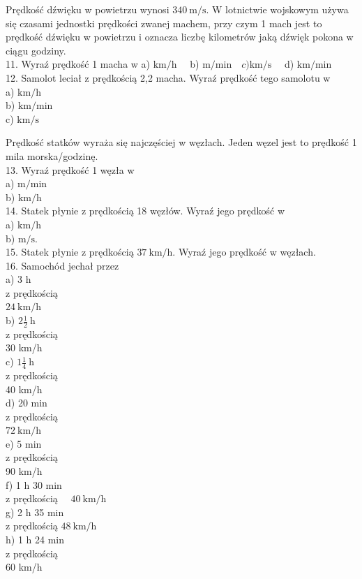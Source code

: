 \documentclass[10pt]{article}
\begin{document}
Prędkość dźwięku w powietrzu wynosi \(340 \mathrm{~m} / \mathrm{s}\). W lotnictwie wojskowym używa się czasami jednostki prędkości zwanej machem, przy czym 1 mach jest to prędkość dźwięku w powietrzu i oznacza liczbę kilometrów jaką dźwięk pokona w ciągu godziny.\\
11. Wyraź prędkość 1 macha w a) \(\mathrm{km} / \mathrm{h} \quad\) b) \(\mathrm{m} / \mathrm{min} \quad c) \mathrm{km} / \mathrm{s} \quad\) d) \(\mathrm{km} / \mathrm{min}\)\\
12. Samolot leciał z prędkością 2,2 macha. Wyraź prędkość tego samolotu w\\
a) \(\mathrm{km} / \mathrm{h}\)\\
b) \(\mathrm{km} / \mathrm{min}\)\\
c) \(\mathrm{km} / \mathrm{s}\)

Prędkość statków wyraża się najczęściej w węzłach. Jeden węzel jest to prędkość 1 mila morska/godzinę.\\
13. Wyraź prędkość 1 węzła w\\
a) \(\mathrm{m} / \mathrm{min}\)\\
b) \(\mathrm{km} / \mathrm{h}\)\\
14. Statek płynie z prędkością 18 węzłów. Wyraź jego prędkość w\\
a) \(\mathrm{km} / \mathrm{h}\)\\
b) \(\mathrm{m} / \mathrm{s}\).\\
15. Statek płynie z prędkością \(37 \mathrm{~km} / \mathrm{h}\). Wyraź jego prędkość w węzłach.\\
16. Samochód jechał przez\\
a) 3 h\\
z prędkością\\
\(24 \mathrm{~km} / \mathrm{h}\)\\
b) \(2 \frac{1}{2} \mathrm{~h}\)\\
z prędkością\\
30 km/h\\
c) \(1 \frac{1}{4} \mathrm{~h}\)\\
z prędkością\\
40 km/h\\
d) 20 min\\
z prędkością\\
\(72 \mathrm{~km} / \mathrm{h}\)\\
e) 5 min\\
z prędkością\\
90 km/h\\
f) 1 h 30 min\\
z prędkością \(\quad 40 \mathrm{~km} / \mathrm{h}\)\\
g) 2 h 35 min\\
z prędkością \(48 \mathrm{~km} / \mathrm{h}\)\\
h) 1 h 24 min\\
z prędkością\\
60 km/h
\end{document}
